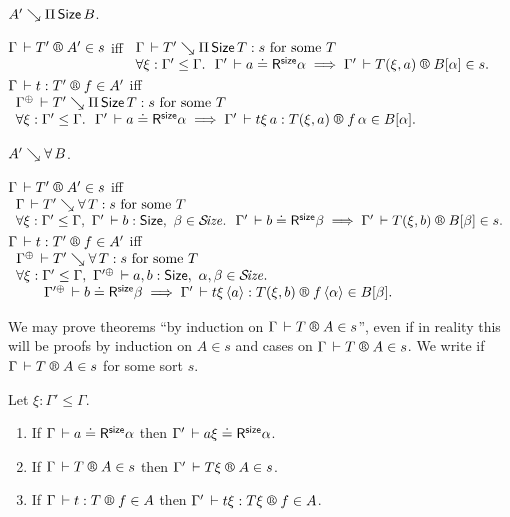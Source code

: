 \documentclass[acmlarge,review,anonymous]{acmart}\settopmatter{printfolios=true}
\begin{document}
\begin{caselist}
\vspace{2ex}
\nextcase $A' \searrow \Pi\,\mathsf{Size}\, B$.

\noindent
$\LRTS \Gamma {T'} {A'} s$ iff
\(
\begin{array}[t]{l}
\Gamma \der T' \evalsto \piT \Size T : s \mforsome T\\
\forall \xi : \Gamma' \leq \Gamma.\ \
\LRSize {\Gamma'} a \alpha
\implies \LRTS {\Gamma'} {T(\xi,a)} {B[\alpha]} s
.
\end{array}
\) \\
$\LR \Gamma t {T'} f {A'}$ iff
\(
\begin{array}[t]{l}
\resurrect\Gamma \der T' \evalsto \piT \Size T : s \mforsome T\\
\forall \xi : \Gamma' \leq \Gamma.\ \
\LRSize {\Gamma'} a \alpha
\implies \LR {\Gamma'} {t\xi\,a} {T(\xi,a)} {f\,\alpha} {B[\alpha]}
.
\end{array}
\)

\vspace{2ex}
\nextcase $A' \searrow \forall\, B$.

\noindent
$\LRTS \Gamma {T'} {A'} s$ iff
\(
\begin{array}[t]{l}
\Gamma \der T' \evalsto \forallT T : s \mforsome T\\
\forall \xi : \Gamma' \leq \Gamma,\
{\Gamma'} \der b : \Size,\
\beta \in \SIZE. \ \
\LRSize {\Gamma'} b \beta
\implies \LRTS {\Gamma'} {T(\xi,b)} {B[\beta]} s
.
\end{array}
\) \\
$\LR \Gamma t {T'} f {A'}$ iff
\(
\begin{array}[t]{l}
\resurrect\Gamma \der T' \evalsto \forallT T : s \mforsome T\\
\forall \xi : \Gamma' \leq \Gamma,\
\resurrect{\Gamma'} \der a,b : \Size,\
\alpha,\beta \in \SIZE. \ \\ \qquad
\LRSize {\resurrect{\Gamma'}} b \beta
\implies \LR {\Gamma'} {t\xi\,\ann a} {T(\xi,b)} {f\,\ann\alpha} {B[\beta]}
.
\end{array}
\)
\end{caselist}
We may prove theorems ``by induction on $\LRTS \Gamma T A s$'', even if in reality this will be proofs by induction on $A \in s$ and cases on $\LRTS \Gamma T A s$.
We write \fbox{$\RG \Gamma T A$} if\/ $\LRTS \Gamma T A s$ for some sort $s$.


\begin{lemma}[Weakening]
  Let $\xi : \Gamma' \leq \Gamma$.
  \begin{enumerate}
  \item If\/ $\Gamma \,\vdash a \doteq \mathsf{R}^{\mathsf{size}} \alpha$ then $\Gamma' \,\vdash a\xi \doteq \mathsf{R}^{\mathsf{size}} \alpha$.
  \item If\/ $\LRTS {\Gamma} T A s$ then $\LRTS{\Gamma'}{T\xi}A s$.
  \item If\/ $\LR \Gamma t T f A$ then $\LR{\Gamma'}{t\xi}{T\xi} f A$.
  \end{enumerate}
\end{lemma}
\end{document}
